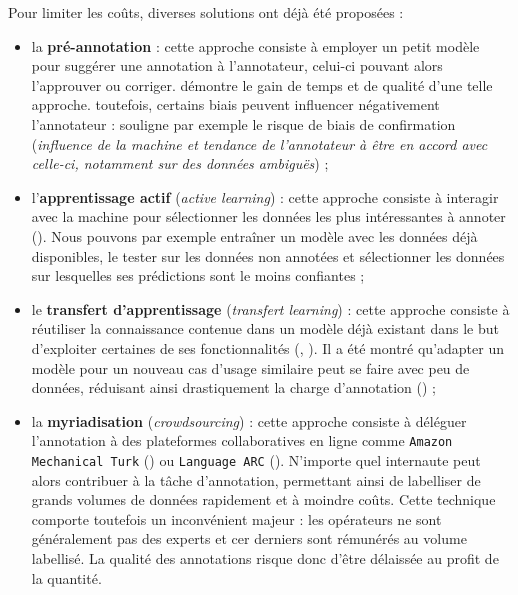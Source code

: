 			\begin{leftBarIdea}
				Pour limiter les coûts, diverses solutions ont déjà été proposées :
				\begin{itemize}
					\item la \textbf{pré-annotation} :
						cette approche consiste à employer un petit modèle pour suggérer une annotation à l'annotateur, celui-ci pouvant alors l'approuver ou corriger.
						\cite{fort-sagot:2010:influence-preannotation-postagged} démontre le gain de temps et de qualité d'une telle approche.
						toutefois, certains biais peuvent influencer négativement l'annotateur : \cite{dandapat-etal:2009:complex-linguistic-annotation} souligne par exemple le risque de biais de confirmation (\textit{influence de la machine et tendance de l'annotateur à être en accord avec celle-ci, notamment sur des données ambiguës}) ;
					\item l'\textbf{apprentissage actif} (\textit{active learning}) :
						cette approche consiste à interagir avec la machine pour sélectionner les données les plus intéressantes à annoter (\cite{settles:2010:active-learning-literature}).
						Nous pouvons par exemple entraîner un modèle avec les données déjà disponibles, le tester sur les données non annotées et sélectionner les données sur lesquelles ses prédictions sont le moins confiantes ;
					\item le \textbf{transfert d'apprentissage} (\textit{transfert learning}) :
						cette approche consiste à réutiliser la connaissance contenue dans un modèle déjà existant dans le but d'exploiter certaines de ses fonctionnalités (\cite{zhuang-etal:2021:comprehensive-survey-transfer}, \cite{iman-etal:2023:review-deep-transfer}).
						Il a été montré qu'adapter un modèle pour un nouveau cas d'usage similaire peut se faire avec peu de données, réduisant ainsi drastiquement la charge d'annotation (\cite{parnami-lee:2022:learning-few-examples}) ;
					\item la \textbf{myriadisation} (\textit{crowdsourcing}) :
						cette approche consiste à déléguer l'annotation à des plateformes collaboratives en ligne comme \texttt{Amazon Mechanical Turk} (\cite{callison-burch-dredze:2010:creating-speech-language}) ou \texttt{Language ARC} (\cite{fiumara-etal:2020:languagearc-developing-language}).
						N'importe quel internaute peut alors contribuer à la tâche d'annotation, permettant ainsi de labelliser de grands volumes de données rapidement et à moindre coûts.
						Cette technique comporte toutefois un inconvénient majeur : les opérateurs ne sont généralement pas des experts et cer derniers sont rémunérés au volume labellisé.
						La qualité des annotations risque donc d'être délaissée au profit de la quantité.
				\end{itemize}
			\end{leftBarIdea}
		

